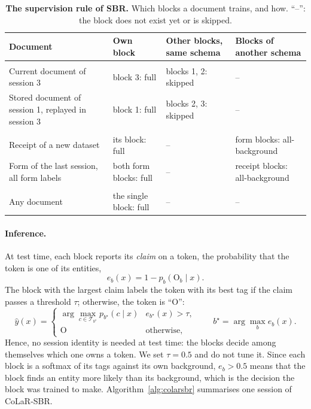 \begin{table}[!htbp]
  \centering
  \caption[The supervision rule of SBR on examples]{\textbf{The supervision rule of SBR.}
  Which blocks a document trains, and how. ``--'': the block does not exist yet or is
  skipped.}
  \label{tab:supervision}
  \begin{tabularx}{\textwidth}{@{}>{\raggedright\arraybackslash}p{4.4cm}>{\raggedright\arraybackslash}p{2.6cm}>{\raggedright\arraybackslash}p{2.9cm}L@{}}
    \toprule
    Document & Own block & Other blocks, same schema & Blocks of another schema \\
    \midrule
     \\
    Current document of session 3 & block 3: full & blocks 1, 2: skipped & -- \\
    Stored document of session 1, replayed in session 3 & block 1: full & blocks 2, 3: skipped & -- \\
    \addlinespace
     \\
    Receipt of a new dataset & its block: full & -- & form blocks: all-background \\
    Form of the last session, all form labels & both form blocks: full & -- & receipt blocks: all-background \\
    \addlinespace
     \\
    Any document & the single block: full & -- & -- \\
    \bottomrule
  \end{tabularx}
\end{table}

\paragraph{Inference.} At test time, each block reports its \emph{claim} on a token, the
probability that the token is one of its entities,
\begin{equation}
  e_b(x)=1-p_b(\mathrm{O}_b\mid x).
  \label{eq:claim}
\end{equation}
The block with the largest claim labels the token with its best tag if the claim passes a
threshold $\tau$; otherwise, the token is ``O'':
\begin{equation}
  \hat y(x)=\begin{cases}\arg\max_{c\in\mathcal{T}_{b^{\star}}}p_{b^{\star}}(c\mid x) & e_{b^{\star}}(x)>\tau,\\[2pt]
  \mathrm{O} & \text{otherwise,}\end{cases}\qquad b^{\star}=\arg\max_b e_b(x).
  \label{eq:infer}
\end{equation}
Hence, no session identity is needed at test time: the blocks decide among themselves which
one owns a token. We set $\tau=0.5$ and do not tune it. Since each block is a softmax of its
tags against its own background, $e_b>0.5$ means that the block finds an entity more likely
than its background, which is the decision the block was trained to make.
Algorithm~\ref{alg:colarsbr} summarises one session of CoLaR-SBR.

